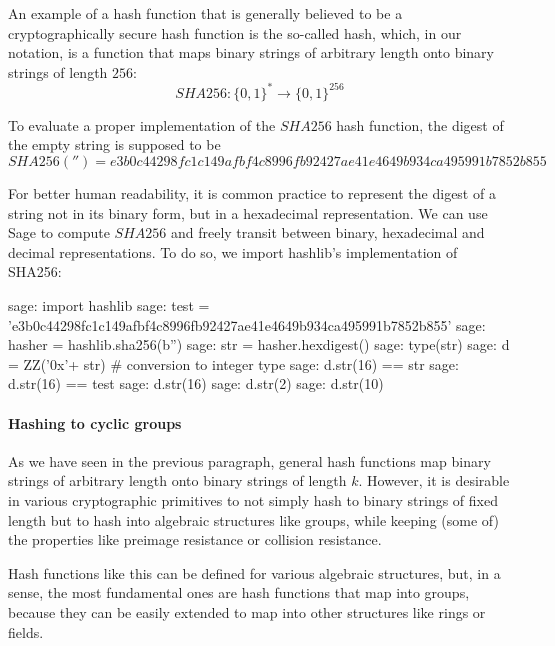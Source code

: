 \begin{example}\label{ex:SHA256}An example of a hash function that is generally believed to be a cryptographically secure hash function is the so-called  hash, which, in our notation, is a function that maps binary strings of arbitrary length onto binary strings of length $256$:
\begin{equation}
SHA256: \{0,1\}^* \to \{0,1\}^{256}
\end{equation}

 To evaluate a proper implementation of the $SHA256$ hash function, the digest of the empty string is supposed to be
\begin{equation}
SHA256('')= e3b0c44298fc1c149afbf4c8996fb92427ae41e4649b934ca495991b7852b855
\end{equation}

For better human readability, it is common practice to represent the digest of a string not in its binary form, but in a hexadecimal representation. We can use Sage to compute $SHA256$ and freely transit between binary, hexadecimal and decimal representations. To do so, we import hashlib's implementation of SHA256:
\begin{sagecommandline}
sage: import hashlib
sage: test = 'e3b0c44298fc1c149afbf4c8996fb92427ae41e4649b934ca495991b7852b855'
sage: hasher = hashlib.sha256(b'')
sage: str = hasher.hexdigest()
sage: type(str)
sage: d = ZZ('0x'+ str) # conversion to integer type
sage: d.str(16) == str
sage: d.str(16) == test
sage: d.str(16)
sage: d.str(2)
sage: d.str(10)
\end{sagecommandline}
\end{example}

\paragraph{Hashing to cyclic groups} As we have seen in the previous paragraph, general hash functions map binary strings of arbitrary length onto binary strings of length $k$. However, it is desirable in various cryptographic primitives to not simply hash to binary strings of fixed length but to hash into algebraic structures like groups, while keeping (some of) the properties like preimage resistance or collision resistance.


Hash functions like this can be defined for various algebraic structures, but, in a sense, the most fundamental ones are hash functions that map into groups, because they can be easily extended to map into other structures like rings or fields.

